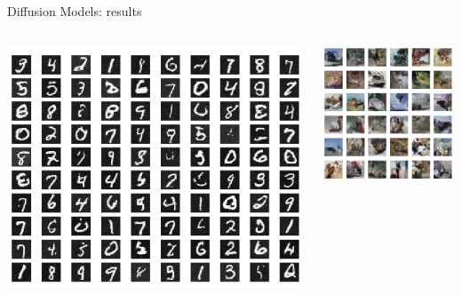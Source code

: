 \documentclass{beamer}
\begin{document}
\begin{frame}{Diffusion Models: results \cite{sohldickstein2015deep}}
    \begin{columns}
        \begin{column}{0.565\textwidth}
            \begin{center}
                \includegraphics[width=\textwidth]{../images/2022-03-17-diffusion_models_files/dm_mnist_sample.png}
            \end{center}
        \end{column}
        \begin{column}{0.435\textwidth}
            \begin{center}
                \includegraphics[width=\textwidth]{../images/2022-03-17-diffusion_models_files/dm_cifar_sample.png}
            \end{center}
        \end{column}
    \end{columns}
\end{frame}
\end{document}
